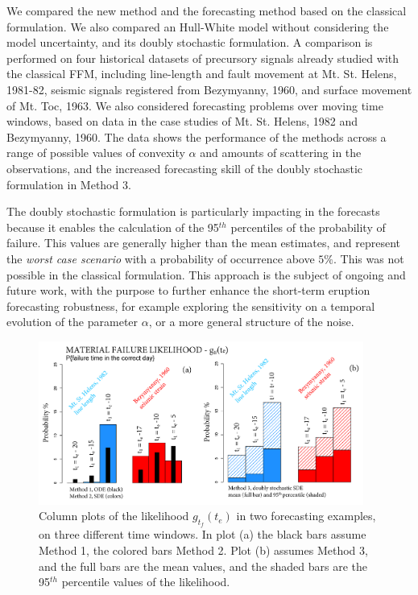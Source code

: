 \documentclass{article}
\begin{document}
We compared the new method and the forecasting method based on the classical formulation. We also compared an Hull-White model without considering the model uncertainty, and its doubly stochastic formulation. A comparison is performed on four historical datasets of precursory signals already studied with the classical FFM, including line-length and fault movement at Mt. St. Helens, 1981-82, seismic signals registered from Bezymyanny, 1960, and surface movement of Mt. Toc, 1963. We also considered forecasting problems over moving time windows, based on data in the case studies of Mt. St. Helens, 1982 and Bezymyanny, 1960. The data shows the performance of the methods across a range of possible values of convexity $\alpha$ and amounts of scattering in the observations, and the increased forecasting skill of the doubly stochastic formulation in Method 3.

The doubly stochastic formulation is particularly impacting in the forecasts because it enables the calculation of the 95$^{th}$ percentiles of the probability of failure. This values are generally higher than the mean estimates, and represent the \emph{worst case scenario} with a probability of occurrence above $5\%$. This was not possible in the classical formulation. This approach is the subject of ongoing and future work, with the purpose to further enhance the short-term eruption forecasting robustness, for example exploring the sensitivity on a temporal evolution of the parameter $\alpha$, or a more general structure of the noise.

\begin{figure}[H]
\centering
\includegraphics[width=0.95\textwidth]{Fig16_plusX.png}
\caption{Column plots of the likelihood $g_{t_f}(t_e)$ in two forecasting examples, on three different time windows. In plot (a) the black bars assume Method 1, the colored bars Method 2. Plot (b) assumes Method 3, and the full bars are the mean values, and the shaded bars are the 95$^{th}$ percentile values of the likelihood.}
\label{Fig16}
\end{figure}
\end{document}
